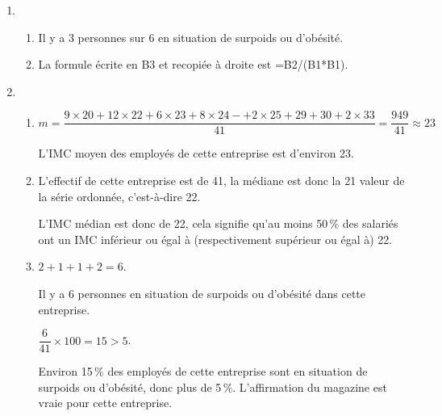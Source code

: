 
\medskip
\begin{enumerate}
\item 
	\begin{enumerate}
		\item Il y a 3 personnes sur 6 en situation de surpoids ou d'obésité.
		\item La formule écrite en B3 et recopiée à droite est =B2/(B1*B1).
	\end{enumerate}
\item 
	\begin{enumerate}
		\item $m = \dfrac{9 \times 20 + 12 \times 22 + 6\times 23 +8 \times 24- + 2\times 25 + 29 + 30 + 2 \times 33}{41} = \dfrac{949}{41} \approx  23$
		
L'IMC moyen des employés de cette entreprise est d'environ 23.
		\item L'effectif de cette entreprise est de 41, la médiane est donc la 21 valeur de la série ordonnée, c'est-à-dire 22. 
		
L'IMC médian est donc de 22, cela signifie qu'au moins 50\,\% des salariés ont un IMC inférieur ou égal à (respectivement supérieur ou égal à) 22.
		\item $2 + 1 + 1 + 2 = 6$.

Il y a 6 personnes en situation de surpoids ou d'obésité dans cette entreprise.

$\dfrac{6}{41} \times  100 = 15 > 5$.

Environ 15\,\% des employés de cette entreprise sont en situation de surpoids ou
d'obésité, donc plus de 5\,\%. L'affirmation du magazine est vraie pour cette
entreprise.
	\end{enumerate}
\end{enumerate}

\bigskip

